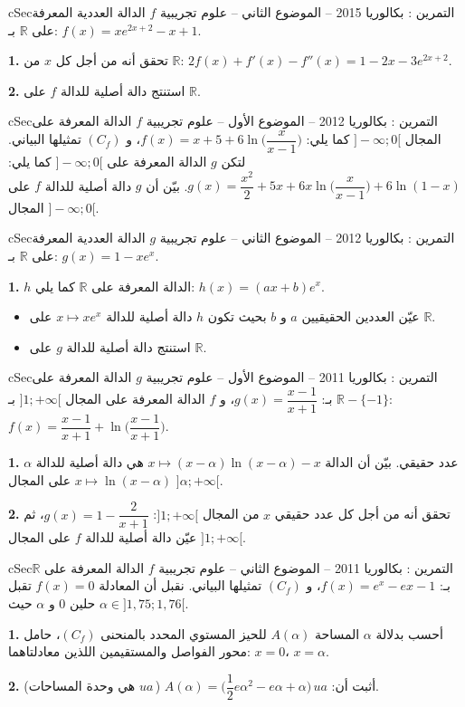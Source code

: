 \documentclass[12pt,a4paper]{article}
\newenvironment{BOX}[2]{\begin{otherlanguage}{english}\begin{arbox}{#1}{#2}}{\end{arbox}\end{otherlanguage}}
\newcounter{exo}
\newenvironment{tamrin}[1]{\stepcounter{exo}\begin{BOX}{cSec}{التمرين \theexo: #1}}{\end{BOX}}
\newcommand{\R}{\mathbb{R}}
\newenvironment{sq}{\begin{itemize}[leftmargin=2.4em,itemsep=3pt]}{\end{itemize}}
\newcommand{\qa}{\item[(أ)]}\newcommand{\qb}{\item[(ب)]}\newcommand{\qc}{\item[(جـ)]}\newcommand{\qd}{\item[(د)]}\newcommand{\qe}{\item[(هـ)]}
\newcommand{\QQ}[1]{\par\smallskip\textbf{#1.} }
\begin{document}
\begin{tamrin}{بكالوريا 2015 -- الموضوع الثاني -- علوم تجريبية}
$f$ الدالة العددية المعرفة على $\R$ بـ: $f(x)=xe^{2x+2}-x+1$.
\QQ{1} تحقق أنه من أجل كل $x$ من $\R$: $2f(x)+f'(x)-f''(x)=1-2x-3e^{2x+2}$.
\QQ{2} استنتج دالة أصلية للدالة $f$ على $\R$.
\end{tamrin}

\begin{tamrin}{بكالوريا 2012 -- الموضوع الأول -- علوم تجريبية}
$f$ الدالة المعرفة على المجال $]-\infty;0[$ كما يلي: $f(x)=x+5+6\ln\Big(\dfrac{x}{x-1}\Big)$، و $(C_f)$ تمثيلها البياني.
لتكن $g$ الدالة المعرفة على $]-\infty;0[$ كما يلي: $g(x)=\dfrac{x^2}{2}+5x+6x\ln\Big(\dfrac{x}{x-1}\Big)+6\ln(1-x)$.
بيّن أن $g$ دالة أصلية للدالة $f$ على المجال $]-\infty;0[$.
\end{tamrin}

\begin{tamrin}{بكالوريا 2012 -- الموضوع الثاني -- علوم تجريبية}
$g$ الدالة العددية المعرفة على $\R$ بـ: $g(x)=1-xe^x$.
\QQ{1} $h$ الدالة المعرفة على $\R$ كما يلي: $h(x)=(ax+b)e^x$.
\begin{sq}
\qa عيّن العددين الحقيقيين $a$ و $b$ بحيث تكون $h$ دالة أصلية للدالة $x\mapsto xe^x$ على $\R$.
\qb استنتج دالة أصلية للدالة $g$ على $\R$.
\end{sq}
\end{tamrin}

\begin{tamrin}{بكالوريا 2011 -- الموضوع الأول -- علوم تجريبية}
$g$ الدالة المعرفة على $\R-\{-1\}$ بـ: $g(x)=\dfrac{x-1}{x+1}$، و $f$ الدالة المعرفة على المجال $]1;+\infty[$ بـ: $f(x)=\dfrac{x-1}{x+1}+\ln\Big(\dfrac{x-1}{x+1}\Big)$.
\QQ{1} $\alpha$ عدد حقيقي. بيّن أن الدالة $x\mapsto(x-\alpha)\ln(x-\alpha)-x$ هي دالة أصلية للدالة $x\mapsto\ln(x-\alpha)$ على المجال $]\alpha;+\infty[$.
\QQ{2} تحقق أنه من أجل كل عدد حقيقي $x$ من المجال $]1;+\infty[$: $g(x)=1-\dfrac{2}{x+1}$، ثم عيّن دالة أصلية للدالة $f$ على المجال $]1;+\infty[$.
\end{tamrin}

\begin{tamrin}{بكالوريا 2011 -- الموضوع الثاني -- علوم تجريبية}
$f$ الدالة المعرفة على $\R$ بـ: $f(x)=e^x-ex-1$، و $(C_f)$ تمثيلها البياني. نقبل أن المعادلة $f(x)=0$ تقبل حلين $0$ و $\alpha$ حيث $\alpha\in]1{,}75;1{,}76[$.
\QQ{1} أحسب بدلالة $\alpha$ المساحة $A(\alpha)$ للحيز المستوي المحدد بالمنحنى $(C_f)$، حامل محور الفواصل والمستقيمين اللذين معادلتاهما: $x=0$، $x=\alpha$.
\QQ{2} أثبت أن: $A(\alpha)=\Big(\dfrac12e\alpha^2-e\alpha+\alpha\Big)\,ua$ (\,$ua$ هي وحدة المساحات).
\end{tamrin}
\end{document}
